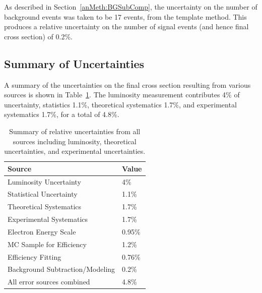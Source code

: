 
As described in Section~\ref{anMeth:BGSubComp}, 
the uncertainty on the number of background 
events was taken to be 17 events, 
from the template method.  
This produces a relative uncertainty 
on the number of signal events 
(and hence final cross section) 
of 0.2\%.  

\subsection{Summary of Uncertainties}
\label{anMeth:SystsSummary}

A summary of the uncertainties on the final 
cross section resulting from various sources 
is shown in Table~\ref{TableSystsSummary}.  
The luminosity measurement 
contributes 4\% of uncertainty, 
statistics 1.1\%, 
theoretical systematics 1.7\%, 
and experimental systematics 1.7\%, %
for a total of 4.8\%.  

\begin{table}[htbp]
  \begin{center}
    \caption[\fixspacing Summary of uncertainties]{
      \fixspacing Summary of relative uncertainties from all sources 
      including luminosity, theoretical uncertainties, 
      and experimental uncertainties.  
    }
    \label{TableSystsSummary}
    \begin{tabular}[]{ | l | l | }
      \hline
      Source & Value  \\ \hline \hline
      Luminosity Uncertainty & 4\% \\ \hline 
      Statistical Uncertainty & 1.1\% \\ \hline 
      Theoretical Systematics & 1.7\% \\ \hline \hline 
      Experimental Systematics & 1.7\% \\ \hline \hline 
      Electron Energy Scale & 0.95\% \\ \hline 
      MC Sample for Efficiency & 1.2\% \\ \hline 
      Efficiency Fitting & 0.76\% \\ \hline 
      Background Subtraction/Modeling & 0.2\% \\ \hline \hline 
      All error sources combined & 4.8\% \\ \hline 
    \end{tabular}
  \end{center}
\end{table}


